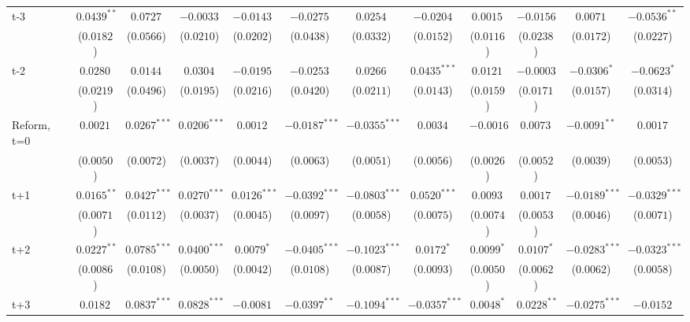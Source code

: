 \begin{landscape}
\begin{table}[htbp]
{\begin{tabular}{lccccccccccc}
t-3 &     $ 0.0439^{**} $ &     $ 0.0727^{} $ &  $ -0.0033^{} $  &  $ -0.0143^{} $  &     $ -0.0275^{} $ &     $ 0.0254^{} $ & $ -0.0204^{} $ & $ 0.0015^{} $ & $ -0.0156^{} $ & $ 0.0071^{} $ & $ -0.0536^{**} $  \\
&     ($0.0182$) &     ($0.0566$) & ($0.0210$)& ($ 0.0202$)  &    ($0.0438$)   &   ($0.0332$) &   ($0.0152$) &   ($0.0116$) &   ($0.0238$) &   ($0.0172$) &   ($0.0227$) \\
t-2 &     $ 0.0280^{} $ &     $ 0.0144^{} $ &  $ 0.0304^{} $  &  $ -0.0195^{} $  &     $ -0.0253^{} $ &     $ 0.0266^{} $ & $ 0.0435^{***} $ & $ 0.0121^{} $ & $ -0.0003^{} $ & $ -0.0306^{*} $ & $ -0.0623^{*} $  \\
&     ($0.0219$) &     ($0.0496$) & ($0.0195$)& ($ 0.0216$)  &    ($0.0420$)   &   ($0.0211$) &   ($0.0143$) &   ($0.0159$) &   ($0.0171$) &   ($0.0157$) &   ($0.0314$) \\
Reform, t=0 &     $ 0.0021^{} $ &     $ 0.0267^{***} $ &  $ 0.0206^{***} $  &  $ 0.0012^{} $  &     $ -0.0187^{***} $ &     $ -0.0355^{***} $ & $ 0.0034^{} $ & $ -0.0016^{} $ & $ 0.0073^{} $ & $ -0.0091^{**} $ & $ 0.0017^{} $  \\
&     ($0.0050$) &     ($0.0072$) & ($0.0037$)& ($ 0.0044$)  &    ($0.0063$)   &   ($0.0051$) &   ($0.0056$) &   ($0.0026$) &   ($0.0052$) &   ($0.0039$) &   ($0.0053$) \\
t+1 &     $ 0.0165^{**} $ &     $ 0.0427^{***} $ &  $ 0.0270^{***} $  &  $ 0.0126^{***} $  &     $ -0.0392^{***} $ &     $ -0.0803^{***} $ & $ 0.0520^{***} $ & $ 0.0093^{} $ & $ 0.0017^{} $ & $ -0.0189^{***} $ & $ -0.0329^{***} $  \\
&     ($0.0071$) &     ($0.0112$) & ($0.0037$)& ($ 0.0045$)  &    ($0.0097$)   &   ($0.0058$) &   ($0.0075$) &   ($0.0074$) &   ($0.0053$) &   ($0.0046$) &   ($0.0071$) \\
t+2 &     $ 0.0227^{**} $ &     $ 0.0785^{***} $ &  $ 0.0400^{***} $  &  $ 0.0079^{*} $  &     $ -0.0405^{***} $ &     $ -0.1023^{***} $ & $ 0.0172^{*} $ & $ 0.0099^{*} $ & $ 0.0107^{*} $ & $ -0.0283^{***} $ & $ -0.0323^{***} $  \\
&     ($0.0086$) &     ($0.0108$) & ($0.0050$)& ($ 0.0042$)  &    ($0.0108$)   &   ($0.0087$) &   ($0.0093$) &   ($0.0050$) &   ($0.0062$) &   ($0.0062$) &   ($0.0058$) \\
t+3 &     $ 0.0182^{} $ &     $ 0.0837^{***} $ &  $ 0.0828^{***} $  &  $ -0.0081^{} $  &     $ -0.0397^{**} $ &     $ -0.1094^{***} $ & $ -0.0357^{***} $ & $ 0.0048^{*} $ & $ 0.0228^{**} $ & $ -0.0275^{***} $ & $ -0.0152^{} $  \\

\end{tabular}}
\end{table}
\end{landscape}
